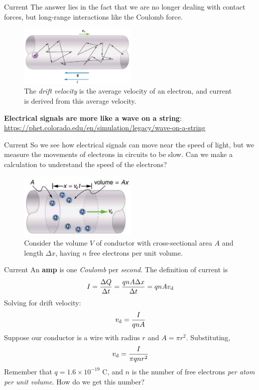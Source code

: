\documentclass{beamer}
\begin{document}
\begin{frame}{Current}
\small
The answer lies in the fact that we are no longer dealing with \alert{contact forces}, but long-range interactions like the Coulomb force.
\begin{figure}
\includegraphics[width=0.5\textwidth]{figures/current2.png}
\caption{\label{fig:current2} The \textit{drift velocity} is the average velocity of an electron, and current is derived from this average velocity.}
\end{figure}
\textbf{Electrical signals are more like a \alert{wave on a string}}: \\ \url{https://phet.colorado.edu/en/simulation/legacy/wave-on-a-string}
\end{frame}

\begin{frame}{Current}
So we see how electrical signals can move near the speed of light, but we measure the movements of electrons in circuits to be slow.  Can we make a calculation to understand the speed of the electrons? \\ \vspace{0.5cm}
\begin{figure}
\includegraphics[width=0.5\textwidth]{figures/current3.png}
\caption{\label{fig:current3} Consider the volume $V$ of conductor with cross-sectional area $A$ and length $\Delta x$, having $n$ free electrons per unit volume.}
\end{figure}
\end{frame}

\begin{frame}{Current}
An \textbf{amp} is one \textit{Coulomb} per \textit{second}.  The definition of current is
\begin{equation}
I = \frac{\Delta Q}{\Delta t} = \frac{qnA\Delta x}{\Delta t} = q n A v_{\rm d}
\end{equation}
Solving for drift velocity:
\begin{equation}
v_{\rm d} = \frac{I}{q n A}
\end{equation}
Suppose our conductor is a wire with radius $r$ and $A = \pi r^2$.  Substituting,
\begin{equation}
v_{\rm d} = \frac{I}{\pi q n r^2}
\end{equation}
Remember that $q = 1.6 \times 10^{-19}$ C, and $n$ is the number of free electrons \textit{per atom per unit volume}.  How do we get this number?
\end{frame}
\end{document}
